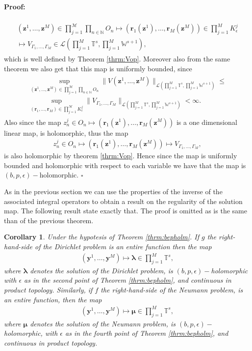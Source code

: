 \documentclass{article}
\newtheorem{corollary}[theorem]{Corollary}
\newenvironment{proof}{\paragraph{Proof:}}{\hfill$\square$}
\newcommand{\bmu} {\bm{\mu}}
\newcommand{\M}{{\mathcal M}}
\newcommand{\IN}{{\mathbb N}}
\newcommand{\IT}{{\mathbb T}}
\newcommand{\IW}{{\mathbb W}}
\newcommand{\bla}{\boldsymbol \lambda}
\newcommand{\bz}{\bm{z}}
\newcommand{\br}{\bm{r}}
\newcommand{\by}{\bm{y}}
\begin{document}
\begin{proof}
\begin{align*}
\begin{split}
(\bz^1,\hdots,\bz^M) \in \prod_{j=1}^\M \prod_{n \in \IN} O_n \mapsto (\br_1(\bz^1),\hdots,\br_M(\bz^M)) \in \prod_{j=1}^M K^j_\epsilon \\\mapsto
V_{\Gamma_1,\hdots,\Gamma_M} \in \mathcal{L}\left(\prod_{j=1}^M \IT^s, \prod_{j=1}^M \IW^{s+1}\right) ,
\end{split}
\end{align*}
which is well defined by Theorem \ref{thrm:Vop}. Moreover also from the same theorem we also get that this map is uniformly bounded, since 
\begin{align*}
\begin{split}
\sup_{(\bz^1,\hdots,\bz^M) \in \prod_{j=1}^\M \prod_{n \in \IN} O_n} \| V(\bz^1,\hdots,\bz^M ) \|_{\mathcal{L}\left(\prod_{j=1}^M \IT^s, \prod_{j=1}^M \IW^{s+1}\right)}  \leq \\
\sup_{(\br_1,\hdots,\br_M) \in \prod_{j=1}^\M K^j_\epsilon} \| V_{\Gamma_1,\hdots,\Gamma_M}\|_{\mathcal{L}\left(\prod_{j=1}^M \IT^s, \prod_{j=1}^M \IW^{s+1}\right)} < \infty.
\end{split}
\end{align*}
Also since the map $z^j_n \in O_n \mapsto (\br_1(\bz^1),\hdots,\br_M(\bz^M))$ is a one dimensional linear map, is holomorphic, thus the map 
\begin{align*}
z^j_n \in O_n \mapsto (\br_1(\bz^1),\hdots,\br_M(\bz^M)) \mapsto V_{\Gamma_1,\hdots,\Gamma_M},
\end{align*}
 is also holomorphic by theorem \ref{thrm:Vop}. Hence since the map is uniformly bounded and holomorphic with respect to each variable we have that the map is $(b,p,\epsilon)-$holomorphic.
\end{proof}

As in the previous section we can use the properties of the inverse of the associated integral operators to obtain a result on the regularity of the solution map. The following result state exactly that. The proof is omitted as is the same than of the previous theorem. 

\begin{corollary}
\label{corollary:bepsol}
Under the hypotesis of Theorem \ref{thrm:bepholm}. If $g$ the right-hand-side of the Dirichlet problem is an entire function then the map 
\begin{align*}
(\by^1,\hdots,\by^M) \mapsto \bla \in \prod_{j=1}^M \IT^s,
\end{align*}
where $\bla$ denotes the solution of the Dirichlet problem, is $(b,p,\epsilon)-$holomorphic with $\epsilon$ as in the second point of Theorem \ref{thrm:bepholm}, and continuous in product topology. Similarly, if $f$ the right-hand-side of the Neumann problem, is an entire function, then the map 
\begin{align*}
(\by^1,\hdots,\by^M) \mapsto \bmu \in \prod_{j=1}^M \IT^s,
\end{align*}
where $\bmu$ denotes the solution of the Neumann problem, is $(b,p,\epsilon)-$holomorphic, with $\epsilon$ as in the fourth point of Theorem \ref{thrm:bepholm}, and continuous in product topology.
\end{corollary}
\end{document}
